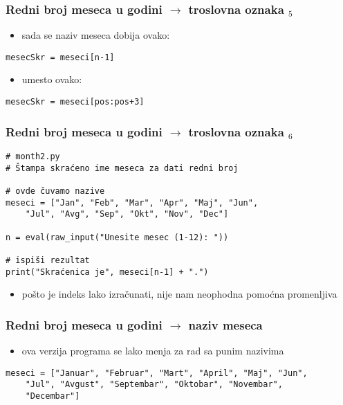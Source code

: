 \documentclass[utf8,compress,aspectratio=169]{beamer}
\begin{document}
\begin{frame}[fragile]
  \frametitle{Redni broj meseca u godini $\rightarrow$ troslovna oznaka $_5$}
  \begin{itemize}
    \item sada se naziv meseca dobija ovako:
  \end{itemize}
\begin{verbatim}
mesecSkr = meseci[n-1]
\end{verbatim}
  \begin{itemize}
    \item umesto ovako:
  \end{itemize}
\begin{verbatim}
mesecSkr = meseci[pos:pos+3]
\end{verbatim}
\end{frame}

\begin{frame}[fragile,shrink=10]
  \frametitle{Redni broj meseca u godini $\rightarrow$ troslovna oznaka $_6$}
\begin{verbatim}
# month2.py
# Štampa skraćeno ime meseca za dati redni broj

# ovde čuvamo nazive
meseci = ["Jan", "Feb", "Mar", "Apr", "Maj", "Jun",
    "Jul", "Avg", "Sep", "Okt", "Nov", "Dec"]

n = eval(raw_input("Unesite mesec (1-12): "))

# ispiši rezultat
print("Skraćenica je", meseci[n-1] + ".")
\end{verbatim}
  \begin{itemize}
    \item pošto je indeks lako izračunati, nije nam neophodna pomoćna promenljiva
  \end{itemize}
\end{frame}

\begin{frame}[fragile,shrink=10]
  \frametitle{Redni broj meseca u godini $\rightarrow$ naziv meseca}
  \begin{itemize}
    \item ova verzija programa se lako menja za rad sa punim nazivima
  \end{itemize}
\begin{verbatim}
meseci = ["Januar", "Februar", "Mart", "April", "Maj", "Jun",
    "Jul", "Avgust", "Septembar", "Oktobar", "Novembar",
    "Decembar"]
\end{verbatim}
\end{frame}
\end{document}
